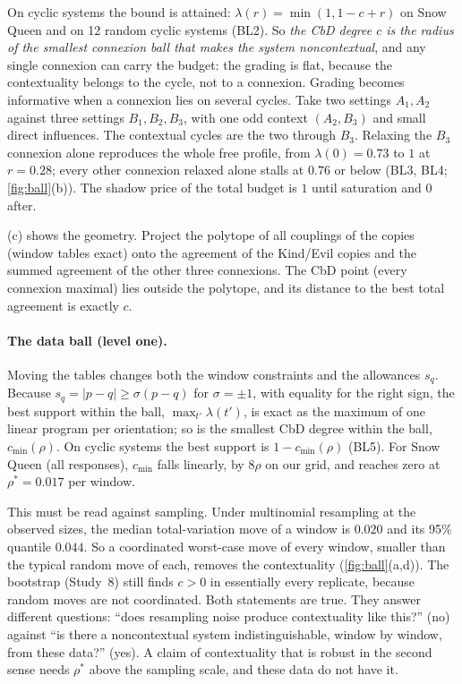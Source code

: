 \documentclass[11pt]{article}
\theoremstyle{definition}\newtheorem{definition}[theorem]{Definition}\newtheorem{remark}[theorem]{Remark}\newtheorem{example}[theorem]{Example}
\begin{document}
On cyclic systems the bound is attained: $\lambda(r)=\min(1,1-c+r)$ on Snow Queen and on 12 random cyclic systems (BL2). So \emph{the
CbD degree $c$ is the radius of the smallest connexion ball that makes the system noncontextual}, and any single connexion can carry the
budget: the grading is flat, because the contextuality belongs to the cycle, not to a connexion. Grading becomes informative when a
connexion lies on several cycles. Take two settings $A_1,A_2$ against three settings $B_1,B_2,B_3$, with one odd context $(A_2,B_3)$ and
small direct influences. The contextual cycles are the two through $B_3$. Relaxing the $B_3$ connexion alone reproduces the whole free
profile, from $\lambda(0)=0.73$ to $1$ at $r=0.28$; every other connexion relaxed alone stalls at $0.76$ or below (BL3, BL4;
\cref{fig:ball}(b)). The shadow price of the total budget is $1$ until saturation and $0$ after.

(c) shows the geometry. Project the polytope of all couplings of the copies (window tables exact) onto the agreement of
the Kind/Evil copies and the summed agreement of the other three connexions. The CbD point (every connexion maximal) lies outside the
polytope, and its distance to the best total agreement is exactly $c$.

\paragraph{The data ball (level one).}
Moving the tables changes both the window constraints and the allowances $s_q$. Because $s_q=|p-q|\ge\sigma(p-q)$ for $\sigma=\pm1$, with
equality for the right sign, the best support within the ball, $\max_{t'}\lambda(t')$, is exact as the maximum of one linear program per
orientation; so is the smallest CbD degree within the ball, $c_{\min}(\rho)$. On cyclic systems the best support is $1-c_{\min}(\rho)$
(BL5). For Snow Queen (all responses), $c_{\min}$ falls linearly, by $8\rho$ on our grid, and reaches zero at $\rho^*=0.017$ per window.

This must be read against sampling. Under multinomial resampling at the observed sizes, the median total-variation move of a window is
$0.020$ and its 95\% quantile $0.044$. So a coordinated worst-case move of every window, smaller than the typical random move of each,
removes the contextuality (\cref{fig:ball}(a,d)). The bootstrap (Study~8) still finds $c>0$ in essentially every replicate, because
random moves are not coordinated. Both statements are true. They answer different questions: ``does resampling noise produce
contextuality like this?'' (no) against ``is there a noncontextual system indistinguishable, window by window, from these data?'' (yes).
A claim of contextuality that is robust in the second sense needs $\rho^*$ above the sampling scale, and these data do not have it.
\end{document}
